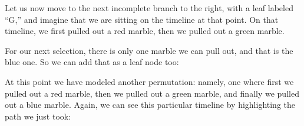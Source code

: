\documentclass[../../../main.tex]{subfiles}
\begin{document}
\noindent
Let us now move to the next incomplete branch to the right, with a leaf labeled ``G,'' and imagine that we are sitting on the timeline at that point. On that timeline, we first pulled out a red marble, then we pulled out a green marble. 

For our next selection, there is only one marble we can pull out, and that is the blue one. So we can add that as a leaf node too:

\begin{center}
\end{center}

\noindent
At this point we have modeled another permutation: namely, one where first we pulled out a red marble, then we pulled out a green marble, and finally we pulled out a blue marble. Again, we can see this particular timeline by highlighting the path we just took:
\end{document}
